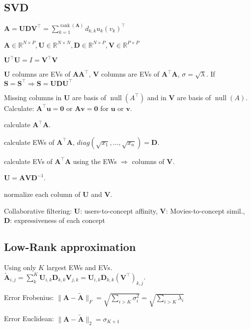 \documentclass[a4paper, 11pt, landscape]{article}
\begin{document}
\begin{multicols*}{3}
\section{SVD}
\begin{inparaitem}[\color{red}\textbullet]
	\item $\mathbf{A} = \mathbf{U} \mathbf{D} \mathbf{V}^\top = \sum_{k=1}^{\operatorname{rank}(\mathbf{A})} d_{k,k} u_k (v_k)^\top$
	\item $\mathbf{A} \in \mathbb{R}^{N \times P}, \mathbf{U} \in \mathbb{R}^{N \times N}, \mathbf{D} \in \mathbb{R}^{N \times P}, \mathbf{V} \in \mathbb{R}^{P \times P}$
	\item $\mathbf{U}^\top \mathbf{U} = I = \mathbf{V}^\top \mathbf{V}$
	\item $\mathbf{U}$ columns are EVs of $\mathbf{A} \mathbf{A}^\top$, $\mathbf{V}$ columns are EVs of $\mathbf{A}^\top \mathbf{A}$, $\sigma = \sqrt{\lambda}$. If $\mathbf{S} = \mathbf{S}^\top \Rightarrow \mathbf{S} = \mathbf{U}\mathbf{D}\mathbf{U}^\top$

	\item Missing columns in $\mathbf{U}$ are basis of $\operatorname{null}(A^\top)$ and in $\mathbf{V}$ are basis of $\operatorname{null}(A)$. Calculate: $\mathbf{A}^\top \mathbf{u} = \mathbf{0}$ or $\mathbf{A} \mathbf{v} = \mathbf{0}$ for $\mathbf{u}$ or $\mathbf{v}$.
\end{inparaitem}

\begin{compactenum}
	\item calculate $\mathbf{A}^\top \mathbf{A}$.
	\item calculate EWs of $\mathbf{A}^\top \mathbf{A}$, $diag(\sqrt{x_1}, \dots, \sqrt{x_n}) = \mathbf{D}$.
	\item calculate EVs of $\mathbf{A}^\top \mathbf{A}$ using the EWs $\Rightarrow$ columns of $\mathbf{V}$.
	\item $\mathbf{U} = \mathbf{A} \mathbf{V} \mathbf{D}^{-1}$.
	\item normalize each column of $\mathbf{U}$ and $\mathbf{V}$.
\end{compactenum}
Collaborative filtering: $\mathbf{U}$: users-to-concept affinity, $\mathbf{V}$: Movies-to-concept simil., $\mathbf{D}$: expressiveness of each concept
\subsection{Low-Rank approximation}
Using only $K$ largest EWs and EVs. $\tilde{\mathbf{A}}_{i, j} = \sum_{k}^K \mathbf{U}_{i, k} \mathbf{D}_{k,k} \mathbf{V}_{j, k} = \mathbf{U}_{i, k} \mathbf{D}_{k,k} (\mathbf{V}^\top)_{k, j}$.
\begin{compactdesc}
	\item[Error Frobenius:] $\|\mathbf{A} - \tilde{\mathbf{A}}\|_F = \sqrt{\sum_{i > K} \sigma_i^2} = \sqrt{\sum_{i > K} \lambda_i}$
	\item[Error Euclidean:] $\|\mathbf{A} - \tilde{\mathbf{A}}\|_2 = \sigma_{K+1}$
\end{compactdesc}


\end{multicols*}
\end{document}
